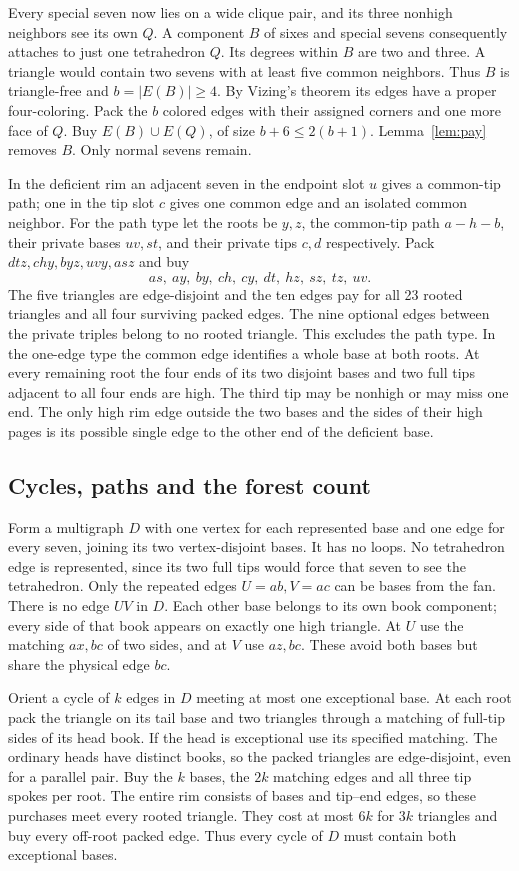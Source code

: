 \documentclass[11pt,a4paper]{amsart}
\begin{document}
Every special seven now lies on a wide clique pair, and its
three nonhigh neighbors see its own $Q$. A component $B$ of
sixes and special sevens consequently attaches to just one
tetrahedron $Q$. Its degrees within $B$ are two and three.
A triangle would contain two sevens with at least five common
neighbors. Thus $B$ is triangle-free and $b=|E(B)|\ge4$.
By Vizing's theorem its edges have a proper four-coloring. Pack
the $b$ colored edges with their assigned corners and one more
face of $Q$. Buy $E(B)\cup E(Q)$, of size $b+6\le2(b+1)$.
Lemma~\ref{lem:pay} removes $B$. Only normal sevens remain.

In the deficient rim an adjacent seven in the endpoint slot $u$
gives a common-tip path; one in the tip slot $c$ gives one
common edge and an isolated common neighbor. For the path type
let the roots be $y,z$, the common-tip path $a-h-b$, their
private bases $uv,st$, and their private tips $c,d$ respectively.
Pack $dtz,chy,byz,uvy,asz$ and buy
\[
 as,\ ay,\ by,\ ch,\ cy,\ dt,\ hz,\ sz,\ tz,\ uv .
\]
The five triangles are edge-disjoint and the ten edges pay for
all 23 rooted triangles and all four surviving packed edges.
The nine optional edges between the private triples belong to
no rooted triangle. This excludes the path type. In the one-edge
type the common edge identifies a whole base at both roots.
At every remaining root the four ends of its two disjoint bases
and two full tips adjacent to all four ends are high. The third
tip may be nonhigh or may miss one end. The only high rim edge
outside the two bases and the sides of their high pages is its
possible single edge to the other end of the deficient base.

\subsection{Cycles, paths and the forest count}
Form a multigraph $D$ with one vertex for each represented base
and one edge for every seven, joining its two vertex-disjoint
bases. It has no loops. No tetrahedron edge is represented,
since its two full tips would force that seven to see the
tetrahedron. Only the repeated edges $U=ab,V=ac$ can be bases
from the fan. There is no edge $UV$ in $D$. Each other base
belongs to its own book component; every side of that book
appears on exactly one high triangle. At $U$ use the matching
$ax,bc$ of two sides, and at $V$ use $az,bc$. These avoid both
bases but share the physical edge $bc$.

Orient a cycle of $k$ edges in $D$ meeting at most one
exceptional base. At each root pack the triangle on its tail
base and two triangles through a matching of full-tip sides of
its head book. If the head is exceptional use its specified
matching. The ordinary heads have distinct books, so the
packed triangles are edge-disjoint, even for a parallel pair.
Buy the $k$ bases, the $2k$ matching edges and all three tip
spokes per root. The entire rim consists of bases and tip--end
edges, so these purchases meet every rooted triangle. They cost
at most $6k$ for $3k$ triangles and buy every off-root packed
edge. Thus every cycle of $D$ must contain both exceptional
bases.
\end{document}
